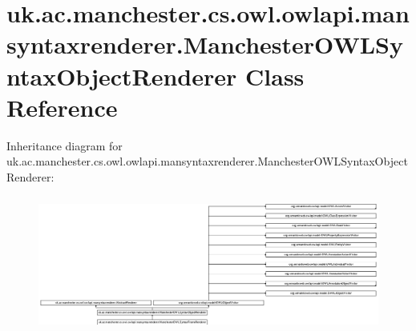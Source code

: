 \hypertarget{classuk_1_1ac_1_1manchester_1_1cs_1_1owl_1_1owlapi_1_1mansyntaxrenderer_1_1_manchester_o_w_l_syntax_object_renderer}{\section{uk.\-ac.\-manchester.\-cs.\-owl.\-owlapi.\-mansyntaxrenderer.\-Manchester\-O\-W\-L\-Syntax\-Object\-Renderer Class Reference}
\label{classuk_1_1ac_1_1manchester_1_1cs_1_1owl_1_1owlapi_1_1mansyntaxrenderer_1_1_manchester_o_w_l_syntax_object_renderer}
}
Inheritance diagram for uk.\-ac.\-manchester.\-cs.\-owl.\-owlapi.\-mansyntaxrenderer.\-Manchester\-O\-W\-L\-Syntax\-Object\-Renderer\-:\begin{figure}[H]
\begin{center}
\leavevmode
\includegraphics[height=4.493827cm]{classuk_1_1ac_1_1manchester_1_1cs_1_1owl_1_1owlapi_1_1mansyntaxrenderer_1_1_manchester_o_w_l_syntax_object_renderer}
\end{center}
\end{figure}

